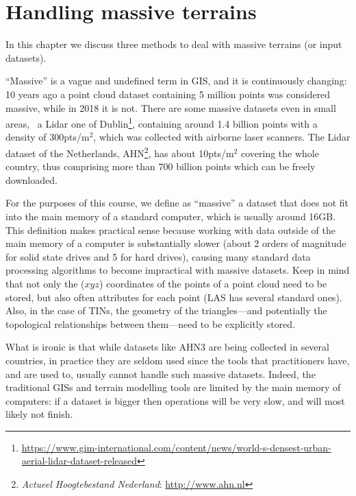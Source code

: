
\graphicspath{{massive/}}

\chapter{Handling massive terrains}
\label{chap:massive}

In this chapter we discuss three methods to deal with massive terrains (or input datasets).

%

``Massive'' is a vague and undefined term in GIS, and it is continuously changing: 10 years ago a point cloud dataset containing 5 million points was considered massive, while in 2018 it is not.
There are some massive datasets even in small areas, \eg\ a Lidar one of Dublin\footnote{\url{https://www.gim-international.com/content/news/world-s-densest-urban-aerial-lidar-dataset-released}}, containing around 1.4 billion points with a density of 300pts/m$^2$, which was collected with airborne laser scanners.
The Lidar dataset of the Netherlands, AHN\footnote{\emph{Actueel Hoogtebestand Nederland}: \url{http://www.ahn.nl}}, has about 10pts/m$^2$ covering the whole country, thus comprising more than 700 billion points which can be freely downloaded.

%

For the purposes of this course, we define as ``massive'' a dataset that does not fit into the main memory of a standard computer, which is usually around 16GB\@.
This definition makes practical sense because working with data outside of the main memory of a computer is substantially slower (about 2 orders of magnitude for solid state drives and 5 for hard drives), causing many standard data processing algorithms to become impractical with massive datasets.
Keep in mind that not only the ($xyz$) coordinates of the points of a point cloud need to be stored, but also often attributes for each point (LAS has several standard ones).
Also, in the case of TINs, the geometry of the triangles---and potentially the topological relationships between them---need to be explicitly stored.

%

What is ironic is that while datasets like AHN3 are being collected in several countries, in practice they are seldom used since the tools that practitioners have, and are used to, usually cannot handle such massive datasets. 
Indeed, the traditional GISs and terrain modelling tools are limited by the main memory of computers: if a dataset is bigger then operations will be very slow, and will most likely not finish.



